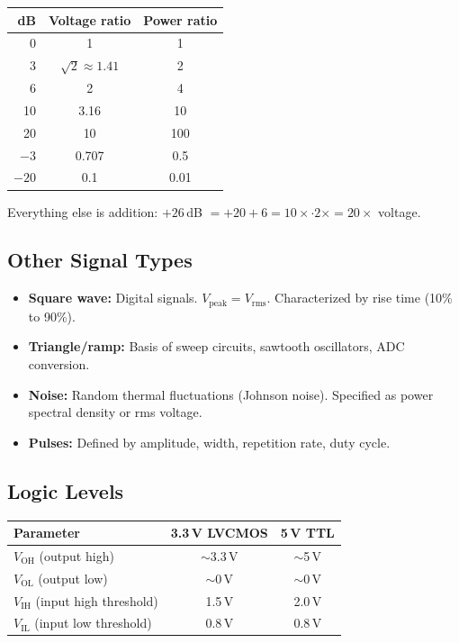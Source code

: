 \documentclass[11pt,a4paper]{article}
\begin{document}
\begin{center}
\begin{tabular}{@{}rcc@{}}
\toprule
dB & Voltage ratio & Power ratio \\
\midrule
0  & 1        & 1    \\
3  & $\sqrt{2} \approx 1.41$ & 2    \\
6  & 2        & 4    \\
10 & 3.16     & 10   \\
20 & 10       & 100  \\
$-3$  & 0.707    & 0.5  \\
$-20$ & 0.1      & 0.01 \\
\bottomrule
\end{tabular}
\end{center}

Everything else is addition: $+26\,$dB $= +20 + 6 = 10\times \cdot 2\times = 20\times$ voltage.

\subsection{Other Signal Types}

\begin{itemize}[nosep]
\item \textbf{Square wave:} Digital signals. $V_{\text{peak}} = V_{\text{rms}}$. Characterized by rise time (10\% to 90\%).
\item \textbf{Triangle/ramp:} Basis of sweep circuits, sawtooth oscillators, ADC conversion.
\item \textbf{Noise:} Random thermal fluctuations (Johnson noise). Specified as power spectral density or rms voltage.
\item \textbf{Pulses:} Defined by amplitude, width, repetition rate, duty cycle.
\end{itemize}

\subsection{Logic Levels}

\begin{center}
\begin{tabular}{@{}lcc@{}}
\toprule
Parameter & 3.3\,V LVCMOS & 5\,V TTL \\
\midrule
$V_{\text{OH}}$ (output high) & $\sim$3.3\,V & $\sim$5\,V \\
$V_{\text{OL}}$ (output low)  & $\sim$0\,V   & $\sim$0\,V \\
$V_{\text{IH}}$ (input high threshold)  & 1.5\,V & 2.0\,V \\
$V_{\text{IL}}$ (input low threshold)   & 0.8\,V & 0.8\,V \\
\bottomrule
\end{tabular}
\end{center}
\end{document}
